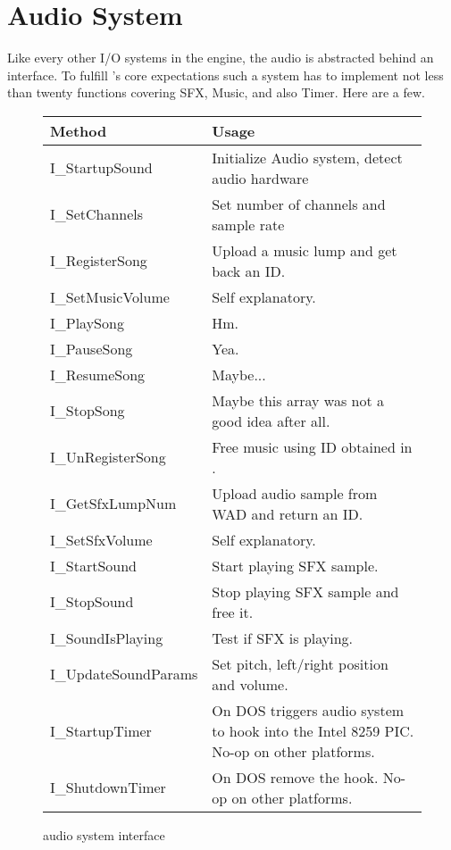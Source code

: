 \section{Audio System}
\label{dmx_section}
Like every other I/O systems in the engine, the audio is abstracted behind an interface. To fulfill \doom's core expectations such a system has to implement not less than twenty functions covering SFX, Music, and also Timer. Here are a few.\\
\par
 \begin{figure}[H]
\centering  
\begin{tabularx}{\textwidth}{ L{0.6}  L{1.4}}
  \toprule
  \textbf{Method} &  \textbf{Usage}\\

  \toprule 
  I\_StartupSound & Initialize Audio system, detect audio hardware\\
  I\_SetChannels & Set number of channels and sample rate\\
  \toprule 
   
I\_RegisterSong & Upload a music lump and get back an ID.\\
I\_SetMusicVolume & Self explanatory.\\
I\_PlaySong & Hm.\\
I\_PauseSong & Yea.\\
I\_ResumeSong & Maybe...\\
I\_StopSong & Maybe this array was not a good idea after all.\\
I\_UnRegisterSong & Free music using ID obtained in .\\




  \toprule 
I\_GetSfxLumpNum & Upload audio sample from WAD and return an ID.\\
I\_SetSfxVolume & Self explanatory.\\
I\_StartSound & Start playing SFX sample.\\
I\_StopSound & Stop playing SFX sample and free it.\\
I\_SoundIsPlaying & Test if SFX is playing.\\
I\_UpdateSoundParams & Set pitch, left/right position and volume.\\

  \toprule 
  
I\_StartupTimer & On DOS triggers audio system to hook into the Intel 8259 PIC. No-op on other platforms.\\
I\_ShutdownTimer & On DOS remove the hook.  No-op on other platforms.\\

   \toprule
\end{tabularx}
\caption{\doom audio system interface}
\end{figure}



